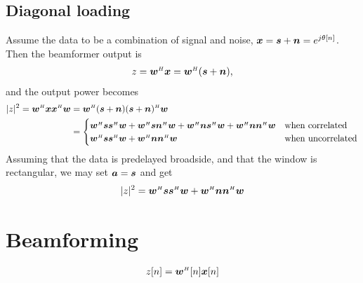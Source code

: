 \subsection{Diagonal loading}

Assume the data to be a combination of signal and noise, $\x = \s + \n = e^{j\theta[n]}$. Then the beamformer output is
%
\begin{align}
z = \w\H\x = \w\H(\s+\n),
\end{align}
%
and the output power becomes
%
\begin{align}
|z|^2 = \w\H\x\x\H\w &= \w\H(\s+\n)(\s+\n)\H\w \nn
&= \begin{cases}
\w\H\s\s\H\w + \w\H\s\n\H\w + \w\H\n\s\H\w + \w\H\n\n\H\w &\text{when correlated}\\
\w\H\s\s\H\w + \w\H\n\n\H\w &\text{when uncorrelated}
\end{cases}
\end{align}
%
Assuming that the data is predelayed broadside, and that the window is rectangular, we may set $\a = \s$ and get
%
\begin{align}
|z|^2 = \w\H\s\s\H\w + \w\H\n\n\H\w
\end{align}


\newpage
\section{Beamforming}



\begin{align}
z[n] = \w\H[n]\x[n]
\end{align}


